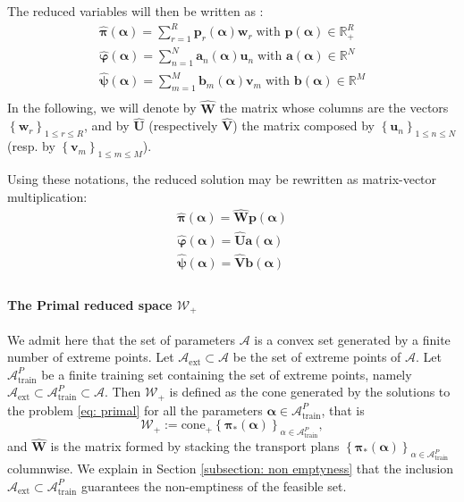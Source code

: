 \documentclass{article}
\def\RR{\mathbb{R}}
\def\cA{\mathcal{A}}
\def\cW{\mathcal{W}}
\def\aalpha{\boldsymbol{\alpha}}
\def\pphi{\boldsymbol{\varphi}}
\def\ppsi{\boldsymbol{\psi}}
\def\ppi{\boldsymbol{\pi}}
\def\aa{\mathbf{a}}
\def\bb{\mathbf{b}}
\def\pp{\mathbf{p}}
\def\uu{\mathbf{u}}
\def\vv{\mathbf{v}}
\def\ww{\mathbf{w}}
\def\UU{\mathbf{U}}
\def\VV{\mathbf{V}}
\def\WW{\mathbf{W}}
\begin{document}
The reduced variables will then be written as :
%
\begin{equation}\label{eq: reduced solutions}
\begin{array}{ll}
    \displaystyle \widehat{\ppi}(\aalpha) = \sum_{r=1}^R \pp_r(\aalpha) \ww_r \; \text{with } \pp(\aalpha)\in \RR^R_+ \\
    \displaystyle  \widehat{\pphi}(\aalpha) = \sum_{n=1}^N \aa_n(\aalpha) \uu_n \; \text{with }  \aa(\aalpha) \in \RR^N \\
    \displaystyle  \widehat{\ppsi}(\aalpha) = \sum_{m=1}^M \bb_m(\aalpha) \vv_m \; \text{with }  \bb(\aalpha) \in \RR^M \\
\end{array}
\end{equation}
%
In the following, we will denote by $\widehat{\WW}$ the matrix whose columns are the vectors $\left\lbrace \ww_r \right\rbrace_{1 \leq r \leq R}$, and by $\widehat{\UU}$ (respectively $\widehat{\VV}$) the matrix composed by $\left\lbrace \uu_n \right\rbrace_{1\leq n \leq N}$ (resp.
by  $\left\lbrace \vv_m \right\rbrace_{1 \leq m \leq M}$).

Using these notations, the reduced solution may be rewritten as matrix-vector multiplication:
\begin{equation}\label{eq: reduced solutions matrix}
\begin{array}{ll}
    \widehat{\ppi}(\aalpha) = \widehat{\WW} \pp(\aalpha) \\
    \widehat{\pphi}(\aalpha) = \widehat{\UU} \aa(\aalpha) \\
    \widehat{\ppsi}(\aalpha) = \widehat{\VV} \bb(\aalpha) \\
\end{array}
\end{equation}
%
%
\paragraph{The Primal reduced space \texorpdfstring{$\mathcal{W}_+$}{}} \label{subsubsection : primal reduced space W}
%
We admit here that the set of parameters $\cA$ is a convex set generated by a finite number of extreme points. Let $\cA_{\text{ext}} \subset \cA$ be the set of extreme points of $\cA$.
Let  $\cA_{\text{train}}^P$ be a finite training set  containing the set of extreme points, namely $\cA_{\text{ext}} \subset \cA_{\text{train}}^P \subset \cA$.
 Then $\cW_+ $ is defined as the cone generated by the solutions to the problem \eqref{eq: primal} for all the parameters $\aalpha \in \cA_{\text{train}}^P$, that is 
 \begin{equation}
      \cW_+ := \text{cone}_+ \left\lbrace {\ppi}_*(\aalpha) \right\rbrace_{\alpha \in \mathcal{A}_{\text{train}}^P} ,
 \end{equation}
%
and $\widehat{\WW}$ is the matrix formed by stacking the transport plans $\left\lbrace \ppi_*(\aalpha) \right\rbrace_{\alpha \in \mathcal{A}_{\text{train}}^P}$ columnwise.
We explain in Section \ref{subsection: non emptyness} that the  inclusion $\cA_{\text{ext}} \subset \cA_{\text{train}}^P$ guarantees the non-emptiness of the feasible set.
%
\end{document}
